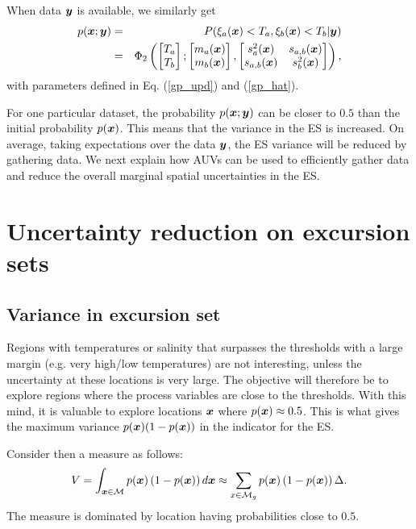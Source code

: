 \documentclass[aoas]{imsart}
\begin{document}
When data ${\boldsymbol y}$ is available, we similarly get
\begin{eqnarray}\label{eq:prob_mv}
 p(\bx;\by) &=& P(\xi_a(\bx) < T_a, \xi_b(\bx) < T_b |\by) 
 \nonumber \\
 &=& \Phi_2 \begin{pmatrix} 
\begin{bmatrix} T_a\\
T_b
\end{bmatrix};
\begin{bmatrix} m_{a}(\bx)\\
m_{b}(\bx)
\end{bmatrix},\begin{bmatrix}
s_{a}^2(\bx) & s_{a,b}(\bx)  \\
s_{a,b}(\bx)  & s_{b}^2(\bx)  
\end{bmatrix}\end{pmatrix},
\end{eqnarray}
with parameters defined in Eq. (\ref{gp_upd}) and (\ref{gp_hat}). 

For one particular dataset, the probability $p({\boldsymbol x};{\boldsymbol y})$ can be closer to $0.5$ than the initial probability $p({\boldsymbol x})$. This means that the variance in the ES is increased. On average, taking expectations over the data ${\boldsymbol y}$, the ES variance will be reduced by gathering data. We next explain how AUVs can be used to efficiently gather data and reduce the overall marginal spatial uncertainties in the ES. 

\section{Uncertainty reduction on excursion sets}\label{sec:sur}

\subsection{Variance in excursion set}

Regions with temperatures or salinity that surpasses the thresholds with a large margin (e.g. very high/low temperatures) are not interesting, unless the uncertainty at these locations is very large. The objective will therefore be to explore regions where the process variables are close to the thresholds. With this mind, it is valuable to explore locations ${\boldsymbol x}$ where $p({\boldsymbol x}) \approx 0.5$. This is what gives the maximum variance $p({\boldsymbol x}) (1-p({\boldsymbol x}))$ in the indicator for the ES. 

Consider then a measure as follows:
\begin{equation}\label{measVAR}
    V = \int_{\bx \in \mathcal{M}} p(\bx) \left(1-p(\bx)\right) d\bx \approx \sum_{x \in \mathcal{M}_g} p(\bx) \left(1-p(\bx)\right) \Delta.
\end{equation}
The measure is dominated by location having probabilities close to $0.5$. 
\end{document}

